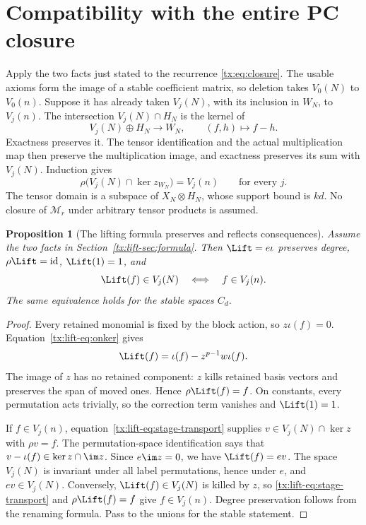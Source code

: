 \documentclass[11pt,a4paper,oneside,openany]{book}
\newtheorem{proposition}[theorem]{Proposition}
\theoremstyle{definition}\newtheorem{definition}[theorem]{Definition}
\theoremstyle{remark}\newtheorem{remark}[theorem]{Remark}
\numberwithin{equation}{chapter}
\begin{document}
\section{Compatibility with the entire PC closure}\label{tx:lift-sec:verify}
Apply the two facts just stated to the recurrence
\eqref{tx:eq:closure}. The usable axioms form the image of a stable
coefficient matrix, so deletion takes $V_0(N)$ to $V_0(n)$. Suppose
it has already taken $V_j(N)$, with its inclusion in $W_N$, to $V_j(n)$.
The intersection $V_j(N)\cap H_N$ is the kernel of
\[
              V_j(N)\oplus H_N\longrightarrow W_N,
              \qquad (f,h)\longmapsto f-h.
\]
Exactness preserves it. The tensor identification and the actual
multiplication map then preserve the multiplication image, and exactness
preserves its sum with $V_j(N)$. Induction gives
\begin{equation}\label{tx:lift-eq:stage-transport}
       \rho\bigl(V_j(N)\cap\ker z_{W_N}\bigr)=V_j(n)
                         \qquad\text{for every }j.
\end{equation}
The tensor domain is a subspace of $X_N\otimes H_N$, whose support bound
is $kd$. No closure of $\mathcal M_r$ under arbitrary tensor products
is assumed.

\begin{proposition}[The lifting formula preserves and reflects consequences]\label{tx:lift-prop:lift}
Assume the two facts in Section~\ref{tx:lift-sec:formula}. Then
$\Lift=e\iota$ preserves degree, $\rho\Lift=\mathrm{id}$,
$\Lift(1)=1$, and
\[
                  \Lift(f)\in V_j(N)\quad\Longleftrightarrow\quad
                  f\in V_j(n).
\]
The same equivalence holds for the stable spaces $C_d$.
\end{proposition}
\begin{proof}
Every retained monomial is fixed by the block action, so $z\iota(f)=0$.
Equation~\eqref{tx:lift-eq:onker} gives
\[
                  \Lift(f)=\iota(f)-z^{p-1}w\iota(f).
\]
The image of $z$ has no retained component: $z$ kills retained basis
vectors and preserves the span of moved ones. Hence $\rho\Lift(f)=f$.
On constants, every permutation acts trivially, so the correction term
vanishes and $\Lift(1)=1$.

If $f\in V_j(n)$, equation~\eqref{tx:lift-eq:stage-transport} supplies
$v\in V_j(N)\cap\ker z$ with $\rho v=f$. The permutation-space
identification says that $v-\iota(f)\in\ker z\cap\im z$. Since
$e\im z=0$, we have $\Lift(f)=ev$. The space $V_j(N)$ is invariant
under all label permutations, hence under $e$, and $ev\in V_j(N)$.
Conversely, $\Lift(f)\in V_j(N)$ is killed by $z$, so
\eqref{tx:lift-eq:stage-transport} and $\rho\Lift(f)=f$ give $f\in V_j(n)$.
Degree preservation follows from the renaming formula. Pass to the
unions for the stable statement.
\end{proof}
\end{document}
